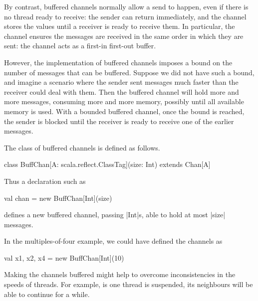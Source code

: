 By contrast, buffered channels normally allow a send to happen, even if there
is no thread ready to receive: the sender can return immediately, and the
channel stores the values until a receiver is ready to receive them.  In
particular, the channel ensures the messages are received in the same order in
which they are sent: the channel acts as a first-in first-out buffer.

However, the implementation of buffered channels imposes a bound on the number
of messages that can be buffered.  Suppose we did not have such a bound, and
imagine a scenario where the sender sent messages much faster than the
receiver could deal with them.  Then the buffered channel will hold more and
more messages, consuming more and more memory, possibly until all available
memory is used.  With a bounded buffered channel, once the bound is reached,
the sender is blocked until the receiver is ready to receive one of the
earlier messages. 



The class of buffered channels is defined as follows.
%
\begin{scala}
class BuffChan[A: scala.reflect.ClassTag](size: Int) extends Chan[A]
\end{scala}
%
Thus a declaration such as
\begin{scala}
val chan = new BuffChan[Int](size)
\end{scala}
defines a new buffered channel, passing |Int|s, able to hold at most |size|
messages.

In the multiples-of-four example, we could have defined the channels as 
%
\begin{scala}
  val x1, x2, x4 = new BuffChan[Int](10)
\end{scala}
%
Making the channels buffered might help to overcome inconsistencies in the
speeds of threads.  For example, is one thread is suspended, its neighbours
will be able to continue for a while.


